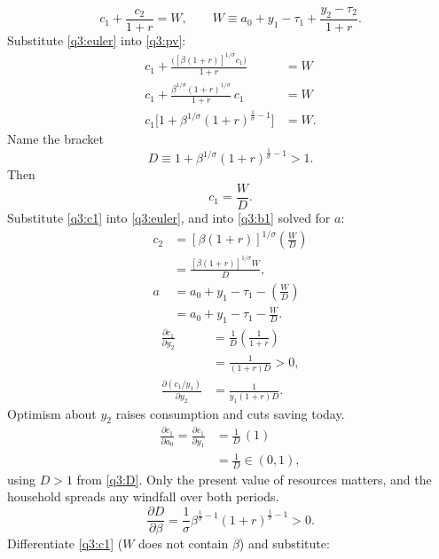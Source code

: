 \begin{sol}
\begin{equation}
c_1+\frac{c_2}{1+r}=W,\qquad W\equiv a_0+y_1-\tau_1+\frac{y_2-\tau_2}{1+r}. \label{q3:pv}
\end{equation}
Substitute \eqref{q3:euler} into \eqref{q3:pv}:
\begin{align*}
c_1+\frac{\big([\beta(1+r)]^{1/\sigma}c_1\big)}{1+r} &= W\\
c_1+\frac{\beta^{1/\sigma}(1+r)^{1/\sigma}}{1+r}\,c_1 &= W\\
c_1\big[1+\beta^{1/\sigma}(1+r)^{\frac1\sigma-1}\big] &= W.
\end{align*}
Name the bracket
\begin{equation}
D\equiv1+\beta^{1/\sigma}(1+r)^{\frac1\sigma-1}>1. \label{q3:D}
\end{equation}
Then
\begin{equation}
c_1=\frac WD. \label{q3:c1}
\end{equation}
Substitute \eqref{q3:c1} into \eqref{q3:euler}, and into \eqref{q3:b1} solved for $a$:
\begin{align*}
c_2 &= [\beta(1+r)]^{1/\sigma}\left(\frac WD\right)\\
&= \frac{[\beta(1+r)]^{1/\sigma}W}{D},\\
a &= a_0+y_1-\tau_1-\left(\frac WD\right)\\
&= a_0+y_1-\tau_1-\frac WD .
\end{align*}
\begin{align*}
\frac{\partial c_1}{\partial y_2} &= \frac1D\left(\frac1{1+r}\right)\\
&= \frac1{(1+r)D}>0,\\
\frac{\partial(c_1/y_1)}{\partial y_2} &= \frac1{y_1(1+r)D}.
\end{align*}
Optimism about $y_2$ raises consumption and cuts saving today.
\begin{align*}
\frac{\partial c_1}{\partial a_0}=\frac{\partial c_1}{\partial y_1} &= \frac1D\,(1)\\
&= \frac1D\in(0,1),
\end{align*}
using $D>1$ from \eqref{q3:D}. Only the present value of resources matters, and the household spreads any windfall over both periods.
\[
\frac{\partial D}{\partial\beta}=\frac1\sigma\beta^{\frac1\sigma-1}(1+r)^{\frac1\sigma-1}>0 .
\]
Differentiate \eqref{q3:c1} ($W$ does not contain $\beta$) and substitute:

\end{sol}
